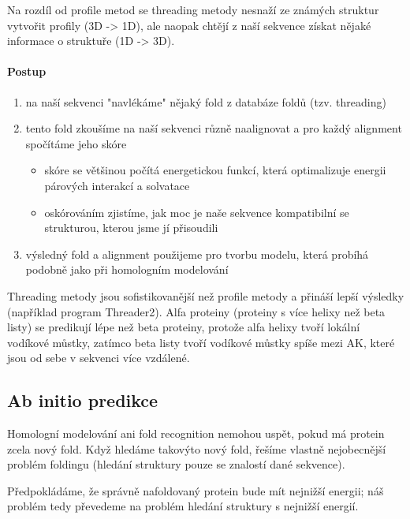 \documentclass[DIV=8]{scrreprt}
\begin{document}
Na rozdíl od profile metod se threading metody nesnaží ze známých struktur vytvořit profily (3D -> 1D), ale naopak chtějí z naší sekvence získat nějaké informace o struktuře (1D -> 3D).

\paragraph{Postup}
\begin{enumerate}[nosep]
    \item na naší sekvenci "navlékáme" nějaký fold z databáze foldů (tzv. threading)
    \item tento fold zkoušíme na naší sekvenci různě naalignovat a pro každý alignment spočítáme jeho skóre
\begin{itemize}[nosep]
    \item skóre se většinou počítá energetickou funkcí, která optimalizuje energii párových interakcí a solvatace
    \item oskórováním zjistíme, jak moc je naše sekvence kompatibilní se strukturou, kterou jsme jí přisoudili
\end{itemize}

    \item výsledný fold a alignment použijeme pro tvorbu modelu, která probíhá podobně jako při homologním modelování
\end{enumerate}



Threading metody jsou sofistikovanější než profile metody a přináší lepší výsledky (například program Threader2). Alfa proteiny (proteiny s více helixy než beta listy) se predikují lépe než beta proteiny, protože alfa helixy tvoří lokální vodíkové můstky, zatímco beta listy tvoří vodíkové můstky spíše mezi AK, které jsou od sebe v sekvenci více vzdálené.

\subsection{Ab initio predikce} \label{Ab initio predikce}


Homologní modelování ani fold recognition nemohou uspět, pokud má protein zcela nový fold. Když hledáme takovýto nový fold, řešíme vlastně nejobecnější problém foldingu (hledání struktury pouze se znalostí dané sekvence).

Předpokládáme, že správně nafoldovaný protein bude mít nejnižší energii; náš problém tedy převedeme na problém hledání struktury s nejnižší energií.
\end{document}
